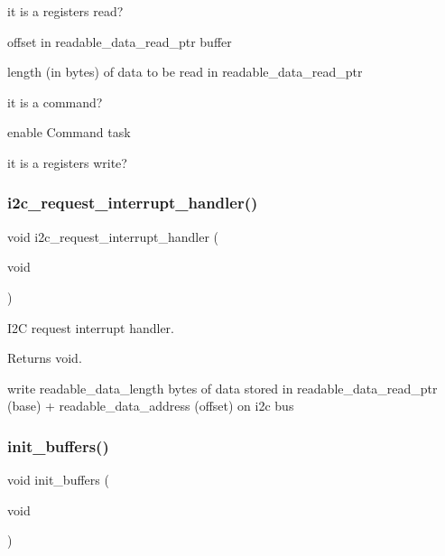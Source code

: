 it is a registers read?

offset in readable\+\_\+data\+\_\+read\+\_\+ptr buffer

length (in bytes) of data to be read in readable\+\_\+data\+\_\+read\+\_\+ptr

it is a command?

enable Command task

it is a registers write? \mbox{\label{i2c-rain_8h_ac1da31566bf05976ecb87372278a1ea8}} 
\subsubsection{\texorpdfstring{i2c\+\_\+request\+\_\+interrupt\+\_\+handler()}{i2c\_request\_interrupt\_handler()}}
{\footnotesize\ttfamily void i2c\+\_\+request\+\_\+interrupt\+\_\+handler (\begin{DoxyParamCaption}\item[{void}]{ }\end{DoxyParamCaption})}



I2C request interrupt handler. 

\begin{DoxyReturn}{Returns}
void. 
\end{DoxyReturn}
write readable\+\_\+data\+\_\+length bytes of data stored in readable\+\_\+data\+\_\+read\+\_\+ptr (base) + readable\+\_\+data\+\_\+address (offset) on i2c bus \mbox{\label{i2c-rain_8h_ad438327c9cf783bd9c519ce8b8ef3bfa}} 
\subsubsection{\texorpdfstring{init\+\_\+buffers()}{init\_buffers()}}
{\footnotesize\ttfamily void init\+\_\+buffers (\begin{DoxyParamCaption}\item[{void}]{ }\end{DoxyParamCaption})}



